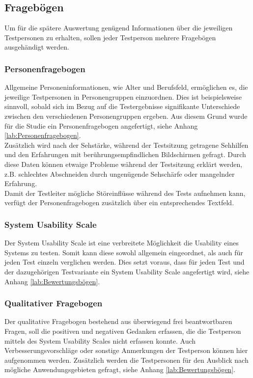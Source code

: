 \documentclass[a4paper,12pt,bibliography=totoc]{scrreprt}%
\begin{document}
\subsection{Fragebögen}
Um für die spätere Auswertung genügend Informationen über die jeweiligen Testpersonen zu erhalten, sollen jeder Testperson mehrere Fragebögen ausgehändigt werden.

\subsubsection{Personenfragebogen}
Allgemeine Personeninformationen, wie Alter und Berufsfeld, ermöglichen es, die jeweilige Testpersonen in Personengruppen einzuordnen. Dies ist beispielsweise sinnvoll, sobald sich im Bezug auf die Testergebnisse signifikante Unterschiede zwischen den verschiedenen Personengruppen ergeben. Aus diesem Grund wurde für die Studie ein Personenfragebogen angefertigt, siehe Anhang \ref{lab:Personenfragebogen}.\\
Zusätzlich wird nach der Sehstärke, während der Testsitzung getragene Sehhilfen und den Erfahrungen mit berührungsempfindlichen Bildschirmen gefragt. Durch diese Daten können etwaige Probleme während der Testsitzung erklärt werden, z.B. schlechtes Abschneiden durch ungenügende Sehschärfe oder mangelnder Erfahrung.\\
Damit der Testleiter mögliche Störeinflüsse während des Tests aufnehmen kann, verfügt der Personenfragebogen zusätzlich über ein entsprechendes Textfeld.

\subsubsection{System Usability Scale}
Der System Usability Scale ist eine verbreitete Möglichkeit die Usability eines Systems zu testen. Somit kann diese sowohl allgemein eingeordnet, als auch für jeden Test einzeln verglichen werden. Dies setzt voraus, dass für jeden Test und der dazugehörigen Testvariante ein System Usability Scale angefertigt wird, siehe Anhang \ref{lab:Bewertungsbögen}.

\subsubsection{Qualitativer Fragebogen}
Der qualitative Fragebogen bestehend aus überwiegend frei beantwortbaren Fragen, soll die positiven und negativen Gedanken erfassen, die die Testperson mittels des System Usability Scales nicht erfassen konnte. Auch Verbesserungsvorschläge oder sonstige Anmerkungen der Testperson können hier aufgenommen werden. Zusätzlich werden die Testpersonen für den Ausblick nach mögliche Anwendungsgebieten gefragt, siehe Anhang \ref{lab:Bewertungsbögen}.
\end{document}
